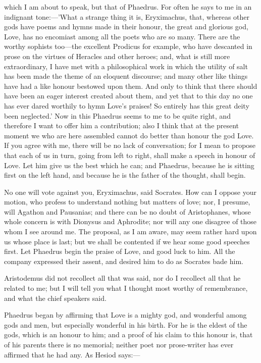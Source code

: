 \documentclass[11pt,letter]{article}
\begin{document}
\par  which I am about to speak, but that of Phaedrus. For often he says to me in an indignant tone:—'What a strange thing it is, Eryximachus, that, whereas other gods have poems and hymns made in their honour, the great and glorious god, Love, has no encomiast among all the poets who are so many. There are the worthy sophists too—the excellent Prodicus for example, who have descanted in prose on the virtues of Heracles and other heroes; and, what is still more extraordinary, I have met with a philosophical work in which the utility of salt has been made the theme of an eloquent discourse; and many other like things have had a like honour bestowed upon them. And only to think that there should have been an eager interest created about them, and yet that to this day no one has ever dared worthily to hymn Love's praises! So entirely has this great deity been neglected.' Now in this Phaedrus seems to me to be quite right, and therefore I want to offer him a contribution; also I think that at the present moment we who are here assembled cannot do better than honour the god Love. If you agree with me, there will be no lack of conversation; for I mean to propose that each of us in turn, going from left to right, shall make a speech in honour of Love. Let him give us the best which he can; and Phaedrus, because he is sitting first on the left hand, and because he is the father of the thought, shall begin.

\par  No one will vote against you, Eryximachus, said Socrates. How can I oppose your motion, who profess to understand nothing but matters of love; nor, I presume, will Agathon and Pausanias; and there can be no doubt of Aristophanes, whose whole concern is with Dionysus and Aphrodite; nor will any one disagree of those whom I see around me. The proposal, as I am aware, may seem rather hard upon us whose place is last; but we shall be contented if we hear some good speeches first. Let Phaedrus begin the praise of Love, and good luck to him. All the company expressed their assent, and desired him to do as Socrates bade him.

\par  Aristodemus did not recollect all that was said, nor do I recollect all that he related to me; but I will tell you what I thought most worthy of remembrance, and what the chief speakers said.

\par  Phaedrus began by affirming that Love is a mighty god, and wonderful among gods and men, but especially wonderful in his birth. For he is the eldest of the gods, which is an honour to him; and a proof of his claim to this honour is, that of his parents there is no memorial; neither poet nor prose-writer has ever affirmed that he had any. As Hesiod says:—
\end{document}
